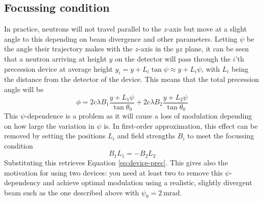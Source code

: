 \subsection{Focussing condition}
In practice, neutrons will not travel parallel to the $z$-axis but move at a slight angle to this depending on beam divergence and other parameters. Letting $\psi$ be the angle their trajectory makes with the $z$-axis in the $yz$ plane, it can be seen that a neutron arriving at height $y$ on the detector will pass through the $i$'th precession device at average height $y_i = y + L_i\tan\psi \approx y + L_i\psi$, with $L_i$ being the distance from the detector of the device. This means that the total precession angle will be
$$\phi = 2c\lambda B_1\frac{y + L_1\psi}{\tan\theta_0} + 2c\lambda B_2\frac{y + L_2\psi}{\tan\theta_0}$$
This $\psi$-dependence is a problem as it will cause a loss of modulation depending on how large the variation in $\psi$ is. In first-order approximation, this effect can be removed by setting the positions $L_i$ and field strengths $B_i$ to meet the focussing condition
$$B_1L_1 = -B_2L_2$$
Substituting this retrieves Equation \eqref{eq:device-prec}. This gives also the motivation for using two devices: you need at least two to remove this $\psi$-dependency and achieve optimal modulation using a realistic, slightly divergent beam such as the one described above with $\psi_0 = \SI{2}{\milli\radian}$.
